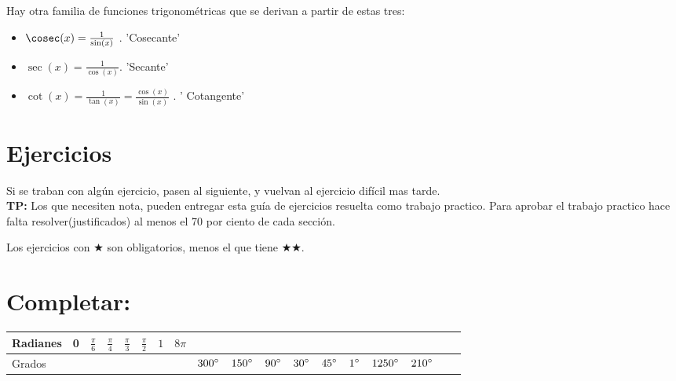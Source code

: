 \documentclass[a4paper,11pt,spanish,sans]{exam}
\newcommand{\Ts}{\rule{0pt}{2.6ex}}       %
\newcommand{\Bs}{\rule[-1.2ex]{0pt}{0pt}} %
\begin{document}
Hay otra familia de funciones trigonométricas que se derivan a partir de estas tres:

\begin{itemize}
	\item  $\cosec (x)=\frac{1}{\sin (x)}$ .  'Cosecante'
	\item  $\sec (x)=\frac{1}{\cos (x)}$.  'Secante'
	\item  $\cot  (x)=\frac{1}{\tan (x)}=\frac{\cos (x)}{\sin(x)}$ . ' Cotangente'
\end{itemize}


\section*{Ejercicios}

Si se traban con algún ejercicio, pasen al siguiente, y vuelvan al ejercicio difícil mas tarde.\\

\textbf{TP:} Los que necesiten nota, pueden entregar esta guía de ejercicios resuelta como trabajo practico. Para aprobar el trabajo practico hace falta resolver(justificados) al menos el 70 por ciento de cada sección.

Los ejercicios con $\bigstar $ son obligatorios, menos el que tiene $\bigstar \bigstar$.


\section{Completar:}

\begin{center}
\label{completar}
\begin{tabular}{|l|c|c|c|c|c|c|c|c|c|c|c|c|c|c|c|c|c|}
	\hline
	Radianes & 0 & $\frac{\pi}{6} $ & $\frac{\pi}{4} $ & $\frac{\pi}{3} $ & $\frac{\pi}{2} $ & $1$ & $8\pi$ &  & & &   &   &  &  & \Ts \Bs \\ \hline
	Grados  &    &  &  & & &   &  & $300\degree$   & $150\degree$  & $90\degree$   & $30\degree$  & $45\degree$ &  $1\degree$ & $1250\degree$ & $210\degree$ \Ts \Bs     \\ \hline
\end{tabular}
\end{center}
\end{document}
